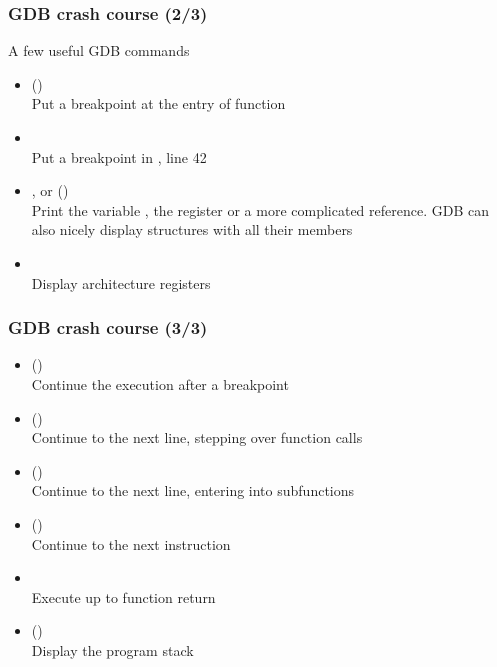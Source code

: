 \begin{frame}
  \frametitle{GDB crash course (2/3)}
  \small
  A few useful GDB commands
  \begin{itemize}
  \item {} ()\\
    Put a breakpoint at the entry of function 
  \item {}\\
    Put a breakpoint in , line 42
  \item {},  or  ()\\
    Print the variable , the register  or a more
    complicated reference. GDB can also nicely display structures with all
    their members
  \item {}\\
    Display architecture registers
  \end{itemize}
\end{frame}

\begin{frame}
  \frametitle{GDB crash course (3/3)}
  \small
  \begin{itemize}
  \item {} ()\\
    Continue the execution after a breakpoint
  \item {} ()\\
    Continue to the next line, stepping over function calls
  \item {} ()\\
    Continue to the next line, entering into subfunctions
  \item {} ()\\
    Continue to the next instruction
  \item {}\\
    Execute up to function return
  \item {} ()\\
    Display the program stack
  \end{itemize}
\end{frame}

